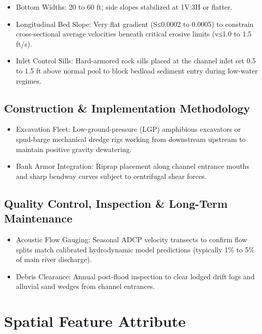 \documentclass[
  letterpaper,
  DIV=11,
  numbers=noendperiod]{scrreprt}
\begin{document}
\begin{itemize}
\item
  Bottom Widths: 20 to 60 ft; side slopes stabilized at 1V:3H or
  flatter.
\item
  Longitudinal Bed Slope: Very flat gradient (S≤0.0002 to 0.0005) to
  constrain cross-sectional average velocities beneath critical erosive
  limits (v≤1.0 to 1.5 ft/s).
\item
  Inlet Control Sills: Hard-armored rock sills placed at the channel
  inlet set 0.5 to 1.5 ft above normal pool to block bedload sediment
  entry during low-water regimes.
\end{itemize}

\subsection{Construction \& Implementation
Methodology}\label{construction-implementation-methodology-5}

\begin{itemize}
\item
  Excavation Fleet: Low-ground-pressure (LGP) amphibious excavators or
  spud-barge mechanical dredge rigs working from downstream upstream to
  maintain positive gravity dewatering.
\item
  Bank Armor Integration: Riprap placement along channel entrance mouths
  and sharp bendway curves subject to centrifugal shear forces.
\end{itemize}

\subsection{Quality Control, Inspection \& Long-Term
Maintenance}\label{quality-control-inspection-long-term-maintenance-5}

\begin{itemize}
\item
  Acoustic Flow Gauging: Seasonal ADCP velocity transects to confirm
  flow splits match calibrated hydrodynamic model predictions (typically
  1\% to 5\% of main river discharge).
\item
  Debris Clearance: Annual post-flood inspection to clear lodged drift
  logs and alluvial sand wedges from channel entrances.
\end{itemize}

\section{Spatial Feature Attribute}\label{spatial-feature-attribute-4}
\end{document}
